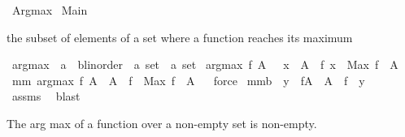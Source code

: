 %
\begin{isabellebody}%
\def\isabellecontext{Argmax}%
%
\isamarkuptrue%
%
\isadelimtheory
%
\endisadelimtheory
%
\isatagtheory
{}\isamarkupfalse%
\ Argmax\isanewline
{}\ Main\isanewline
\isanewline
{}%
\endisatagtheory
{\isafoldtheory}%
%
\isadelimtheory
%
\endisadelimtheory
%
\begin{isamarkuptext}%
the subset of elements of a set where a function reaches its maximum%
\end{isamarkuptext}%
\isamarkuptrue%
\isamarkupfalse%
\ argmax\ {\isacharcolon}{\isacharcolon}\ {\isachardoublequoteopen}{\isacharparenleft}{\isacharprime}a\ {\isasymRightarrow}\ {\isacharprime}b{\isasymColon}linorder{\isacharparenright}\ {\isasymRightarrow}\ {\isacharprime}a\ set\ {\isasymRightarrow}\ {\isacharprime}a\ set{\isachardoublequoteclose}\isanewline
{}\ {\isachardoublequoteopen}argmax\ f\ A\ {\isacharequal}\ {\isacharbraceleft}\ x\ {\isasymin}\ A\ {\isachardot}\ f\ x\ {\isacharequal}\ Max\ {\isacharparenleft}f\ {\isacharbackquote}\ A{\isacharparenright}\ {\isacharbraceright}{\isachardoublequoteclose}\isanewline
\isanewline
{}\isamarkupfalse%
\ mm{}{}{\isacharcolon}\ {\isachardoublequoteopen}argmax\ f\ A\ {\isacharequal}\ A\ {\isasyminter}\ f\ {\isacharminus}{\isacharbackquote}\ {\isacharbraceleft}Max\ {\isacharparenleft}f\ {\isacharbackquote}\ A{\isacharparenright}{\isacharbraceright}{\isachardoublequoteclose}%
\isadelimproof
\ %
\endisadelimproof
%
\isatagproof
{}\isamarkupfalse%
\ force%
\endisatagproof
{\isafoldproof}%
%
\isadelimproof
%
\endisadelimproof
\isanewline
{}\isamarkupfalse%
\ mm{}{}b{\isacharcolon}\ \ {\isachardoublequoteopen}y\ {\isasymin}\ f{\isacharbackquote}A{\isachardoublequoteclose}\ \ {\isachardoublequoteopen}A\ {\isasyminter}\ f\ {\isacharminus}{\isacharbackquote}\ {\isacharbraceleft}y{\isacharbraceright}\ {\isasymnoteq}\ {\isacharbraceleft}{\isacharbraceright}{\isachardoublequoteclose}%
\isadelimproof
\ %
\endisadelimproof
%
\isatagproof
{}\isamarkupfalse%
\ assms\ \isamarkupfalse%
\ blast%
\endisatagproof
{\isafoldproof}%
%
\isadelimproof
%
\endisadelimproof
%
\begin{isamarkuptext}%
The arg max of a function over a non-empty set is non-empty.%
\end{isamarkuptext}%

\end{isabellebody}
